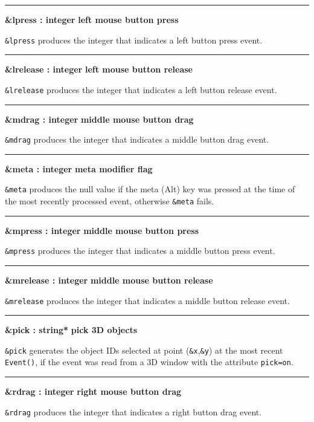 \bigskip\hrule\vspace{0.1cm}
\noindent
{\bf \&lpress : integer } \hfill {\bf left mouse button press}

\noindent
\texttt{\&lpress} produces the integer that indicates a left button
press event.

\bigskip\hrule\vspace{0.1cm}
\noindent
{\bf \&lrelease : integer } \hfill {\bf left mouse button release}

\noindent
\texttt{\&lrelease} produces the integer that indicates a left button
release event.

\bigskip\hrule\vspace{0.1cm}
\noindent
{\bf \&mdrag : integer } \hfill {\bf  middle mouse button drag}

\noindent
\texttt{\&mdrag} produces the integer that indicates a middle button drag event.

\bigskip\hrule\vspace{0.1cm}
\noindent
{\bf \&meta : integer } \hfill {\bf meta modifier flag}

\noindent
\texttt{\&meta} produces the null value if the meta (Alt) key was
pressed at the time of the most recently processed event, otherwise
\texttt{\&meta} fails.

\bigskip\hrule\vspace{0.1cm}
\noindent
{\bf \&mpress : integer } \hfill {\bf middle mouse button press}

\noindent
\texttt{\&mpress} produces the integer that indicates a middle button
press event.

\bigskip\hrule\vspace{0.1cm}
\noindent
{\bf \&mrelease : integer } \hfill {\bf middle mouse button release}

\noindent
\texttt{\&mrelease} produces the integer that indicates a middle button
release event.

\bigskip\hrule\vspace{0.1cm}
\noindent
{\bf \&pick : string* } \hfill {\bf pick 3D objects}

\noindent
\texttt{\&pick} generates the object IDs selected at point
(\texttt{\&x},\texttt{\&y}) at the most recent \texttt{Event()}, if the
event was read from a 3D window with the attribute \texttt{pick=on}.

\bigskip\hrule\vspace{0.1cm}
\noindent
{\bf \&rdrag : integer } \hfill {\bf right mouse button drag}

\noindent
\texttt{\&rdrag} produces the integer that indicates a right button drag
event.

